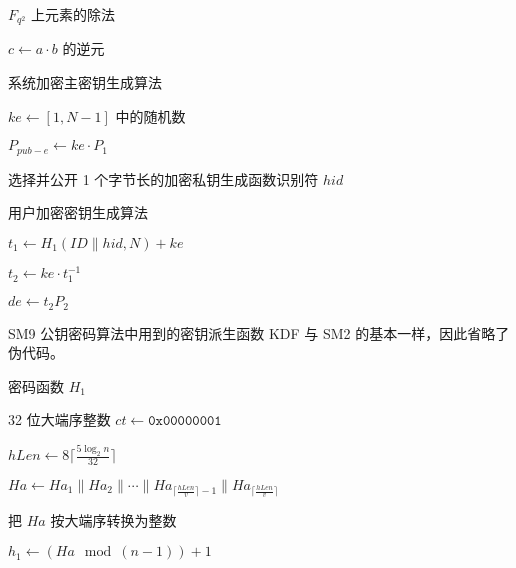 \documentclass[12pt,a4paper]{article}
\begin{document}
\begin{algorithm}[H]
\caption{$ F_{q^2} $ 上元素的除法}

$ c \leftarrow a \cdot b $ 的逆元

\end{algorithm}

\begin{algorithm}[H]
\caption{系统加密主密钥生成算法}

$ {ke} \leftarrow [1, N - 1] $ 中的随机数

$ P_{pub-e} \leftarrow {ke} \cdot P_1 $

选择并公开 1 个字节长的加密私钥生成函数识别符 $ {hid} $

\end{algorithm}

\begin{algorithm}
\caption{用户加密密钥生成算法}

$ t_1 \leftarrow H_1(ID \parallel hid, N) + k e $


$ t_2 \leftarrow {ke} \cdot t_1^{-1} $

$ {de} \leftarrow t_2 P_2 $

\end{algorithm}

SM9 公钥密码算法中用到的密钥派生函数 KDF 与 SM2 的基本一样，因此省略了伪代码。

\begin{algorithm}[H]
\caption{密码函数 $ H_1 $}

32 位大端序整数 $ ct \leftarrow \mathtt{0x00000001} $

$ hLen \leftarrow 8 \lceil \frac{5 \log_2{n}}{32} \rceil $



$ {Ha} \leftarrow {Ha}_1 \parallel {Ha}_2 \parallel \cdots \parallel {Ha}_{\lceil \frac{hLen}{v} \rceil - 1} \parallel {Ha}_{\lceil \frac{hLen}{v} \rceil} $

把 $ {Ha} $ 按大端序转换为整数

$ h_1 \leftarrow ({Ha} \mod (n - 1)) + 1 $

\end{algorithm}
\end{document}
